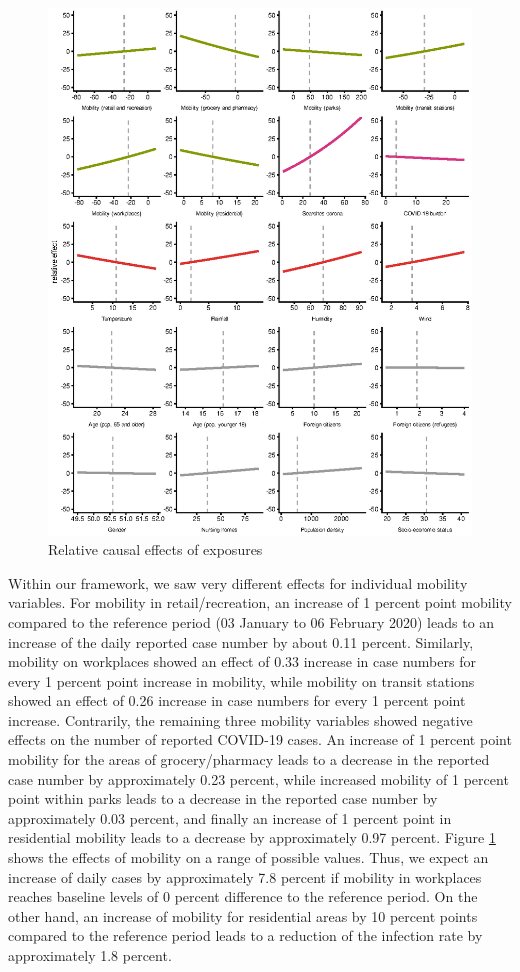 \documentclass[]{elsarticle} %
\begin{document}
\begin{figure}
\centering
\includegraphics{figures/f_exposure_vs_effect_klein.eps}
\caption{\label{fig:effectsrange}Relative causal effects of exposures}
\end{figure}

Within our framework, we saw very different effects for individual mobility variables. For mobility in retail/recreation, an increase of 1 percent point mobility compared to the reference period (03 January to 06 February 2020) leads to an increase of the daily reported case number by about 0.11 percent. Similarly, mobility on workplaces showed an effect of 0.33 increase in case numbers for every 1 percent point increase in mobility, while mobility on transit stations showed an effect of 0.26 increase in case numbers for every 1 percent point increase. Contrarily, the remaining three mobility variables showed negative effects on the number of reported COVID-19 cases. An increase of 1 percent point mobility for the areas of grocery/pharmacy leads to a decrease in the reported case number by approximately 0.23 percent, while increased mobility of 1 percent point within parks leads to a decrease in the reported case number by approximately 0.03 percent, and finally an increase of 1 percent point in residential mobility leads to a decrease by approximately 0.97 percent. Figure \ref{fig:effectsrange} shows the effects of mobility on a range of possible values. Thus, we expect an increase of daily cases by approximately 7.8 percent if mobility in workplaces reaches baseline levels of 0 percent difference to the reference period. On the other hand, an increase of mobility for residential areas by 10 percent points compared to the reference period leads to a reduction of the infection rate by approximately 1.8 percent.
\end{document}
